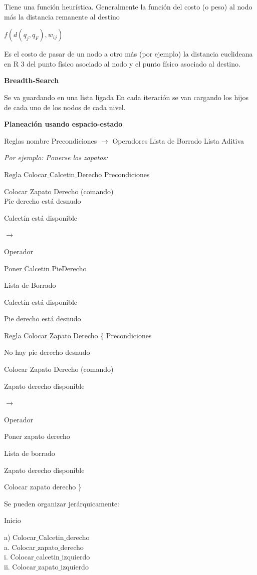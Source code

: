 Tiene una función heurística.
Generalmente la función del costo (o peso) al nodo más la distancia remanente al destino

$f(d(q_j, q_F), w_{ij})$

Es el costo de pasar de un nodo a otro más (por ejemplo) la distancia euclideana en R 3 del punto físico
asociado al nodo y el punto físico asociado al destino.

\textbf{Breadth-Search}

Se va guardando en una lista ligada
En cada iteración se van cargando los hijos de cada uno de los nodos de cada nivel.

\textbf{Planeación usando espacio-estado}

Reglas nombre {
	Precondiciones
	$\rightarrow$
	Operadores
	Lista de Borrado
	Lista Aditiva
}


\textit{Por ejemplo: Ponerse los zapatos:}


Regla Colocar$\_$Calcetin$\_$Derecho
Precondiciones

Colocar Zapato Derecho (comando) \\

Pie derecho está desnudo

Calcetín está disponible

$\rightarrow$

Operador

Poner$\_$Calcetin$\_$PieDerecho

Lista de Borrado

Calcetín está disponible

Pie derecho está desnudo


Regla Colocar$\_$Zapato$\_$Derecho \{
	Precondiciones
	
	No hay pie derecho desnudo
	
	Colocar Zapato Derecho (comando)
	
	Zapato derecho disponible
	
	$\rightarrow$
	
	Operador
	
	Poner zapato derecho
	
	Lista de borrado
	
	Zapato derecho disponible
	
	Colocar zapato derecho
\}



Se pueden organizar jerárquicamente:

Inicio

a) Colocar$\_$Calcetin$\_$derecho \\
a. Colocar$\_$zapato$\_$derecho \\
i. Colocar$\_$calcetin$\_$izquierdo \\
ii. Colocar$\_$zapato$\_$izquierdo \\

